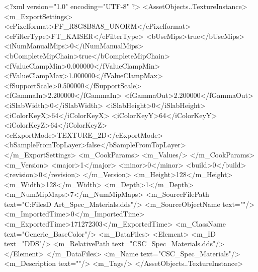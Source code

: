 <?xml version="1.0" encoding="UTF-8" ?>
<AssetObjects..TextureInstance>
	<m_ExportSettings>
		<ePixelformat>PF_R8G8B8A8_UNORM</ePixelformat>
		<eFilterType>FT_KAISER</eFilterType>
		<bUseMips>true</bUseMips>
		<iNumManualMips>0</iNumManualMips>
		<bCompleteMipChain>true</bCompleteMipChain>
		<fValueClampMin>0.000000</fValueClampMin>
		<fValueClampMax>1.000000</fValueClampMax>
		<fSupportScale>0.500000</fSupportScale>
		<fGammaIn>2.200000</fGammaIn>
		<fGammaOut>2.200000</fGammaOut>
		<iSlabWidth>0</iSlabWidth>
		<iSlabHeight>0</iSlabHeight>
		<iColorKeyX>64</iColorKeyX>
		<iColorKeyY>64</iColorKeyY>
		<iColorKeyZ>64</iColorKeyZ>
		<eExportMode>TEXTURE_2D</eExportMode>
		<bSampleFromTopLayer>false</bSampleFromTopLayer>
	</m_ExportSettings>
	<m_CookParams>
		<m_Values/>
	</m_CookParams>
	<m_Version>
		<major>1</major>
		<minor>0</minor>
		<build>0</build>
		<revision>0</revision>
	</m_Version>
	<m_Height>128</m_Height>
	<m_Width>128</m_Width>
	<m_Depth>1</m_Depth>
	<m_NumMipMaps>7</m_NumMipMaps>
	<m_SourceFilePath text="C:\Users\Shadow\Desktop\Working Files\2D Art\Adjacencies\CSC_Spec_Materials.dds"/>
	<m_SourceObjectName text=""/>
	<m_ImportedTime>0</m_ImportedTime>
	<m_ExportedTime>171272303</m_ExportedTime>
	<m_ClassName text="Generic_BaseColor"/>
	<m_DataFiles>
		<Element>
			<m_ID text="DDS"/>
			<m_RelativePath text="CSC_Spec_Materials.dds"/>
		</Element>
	</m_DataFiles>
	<m_Name text="CSC_Spec_Materials"/>
	<m_Description text=""/>
	<m_Tags/>
</AssetObjects..TextureInstance>

